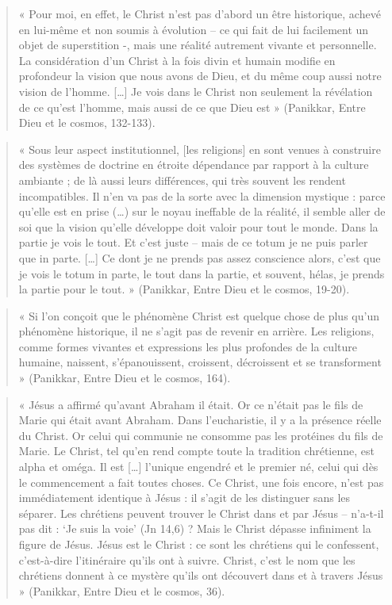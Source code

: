 \begin{quote}
    
« Pour moi, en effet, le Christ n’est pas d’abord un être historique, achevé en lui-même et non 
soumis à évolution – ce qui fait de lui facilement un objet de superstition -, mais une réalité 
autrement vivante et personnelle. La considération d’un Christ à la fois divin et humain modifie en 
profondeur la vision que nous avons de Dieu, et du même coup aussi notre vision de l’homme. […] Je 
vois dans le Christ non seulement la révélation de ce qu’est l’homme, mais aussi de ce que Dieu est 
» (Panikkar, Entre Dieu et le cosmos, 132-133).

\end{quote}
\begin{quote}
    
« Sous leur aspect institutionnel, [les religions] en sont venues à construire des systèmes de 
doctrine en étroite dépendance par rapport à la culture ambiante ; de là aussi leurs différences, 
qui très souvent les rendent incompatibles. Il n’en va pas de la sorte avec la dimension mystique : 
parce qu’elle est en prise (…) sur le noyau ineffable de la réalité, il semble aller de soi que la 
vision qu’elle développe doit valoir pour tout le monde. Dans la partie je vois le tout. Et c’est 
juste – mais de ce totum je ne puis parler que in parte. […] Ce dont je ne prends pas assez 
conscience alors, c’est que je vois le totum in parte, le tout dans la partie, et souvent, hélas, 
je prends la partie pour le tout. » (Panikkar, Entre Dieu et le cosmos, 19-20).

\end{quote}
\begin{quote}
    
« Si l’on conçoit que le phénomène Christ est quelque chose de plus qu’un phénomène historique, il 
ne s’agit pas de revenir en arrière. Les religions, comme formes vivantes et expressions les plus 
profondes de la culture humaine, naissent, s’épanouissent, croissent, décroissent et se 
transforment » (Panikkar, Entre Dieu et le cosmos, 164).

\end{quote}
\begin{quote}
    
« Jésus a affirmé qu’avant Abraham il était. Or ce n’était pas le fils de Marie qui était avant 
Abraham. Dans l’eucharistie, il y a la présence réelle du Christ. Or celui qui communie ne consomme 
pas les protéines du fils de Marie. Le Christ, tel qu’en rend compte toute la tradition chrétienne, 
est alpha et oméga. Il est […] l’unique engendré et le premier né, celui qui dès le commencement a 
fait toutes choses. Ce Christ, une fois encore, n’est pas immédiatement identique à Jésus : il 
s’agit de les distinguer sans les séparer. Les chrétiens peuvent trouver le Christ dans et par 
Jésus – n’a-t-il pas dit : ‘Je suis la voie’ (Jn 14,6) ? Mais le Christ dépasse infiniment la 
figure de Jésus. Jésus est le Christ : ce sont les chrétiens qui le
confessent, c’est-à-dire l’itinéraire qu’ils ont à suivre. Christ, c’est le nom que les chrétiens 
donnent à ce mystère qu’ils ont découvert dans et à travers Jésus » (Panikkar, Entre Dieu et le 
cosmos, 36).

\end{quote}

